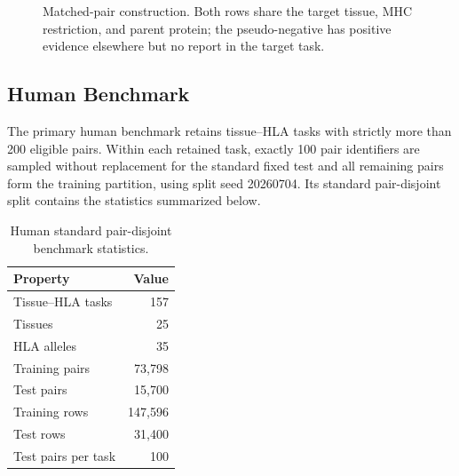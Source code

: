 \begin{figure}[tbp]
\centering
{}
\caption{Matched-pair construction. Both rows share the target tissue, MHC restriction, and parent protein; the pseudo-negative has positive evidence elsewhere but no report in the target task.}
\label{fig:pair-construction}
\end{figure}

\subsection{Human Benchmark}

The primary human benchmark retains tissue--HLA tasks with strictly more than 200 eligible pairs. Within each retained task, exactly 100 pair identifiers are sampled without replacement for the standard fixed test and all remaining pairs form the training partition, using split seed 20260704. Its standard pair-disjoint split contains the statistics summarized below.

\begin{table}[tbp]
\centering
\caption{Human standard pair-disjoint benchmark statistics.}
\label{tab:human-benchmark-stats}
\small
\begin{tabular}{lr}
\toprule
Property & Value \\
\midrule
Tissue--HLA tasks & 157 \\
Tissues & 25 \\
HLA alleles & 35 \\
Training pairs & 73,798 \\
Test pairs & 15,700 \\
Training rows & 147,596 \\
Test rows & 31,400 \\
Test pairs per task & 100 \\
\bottomrule
\end{tabular}
\end{table}

